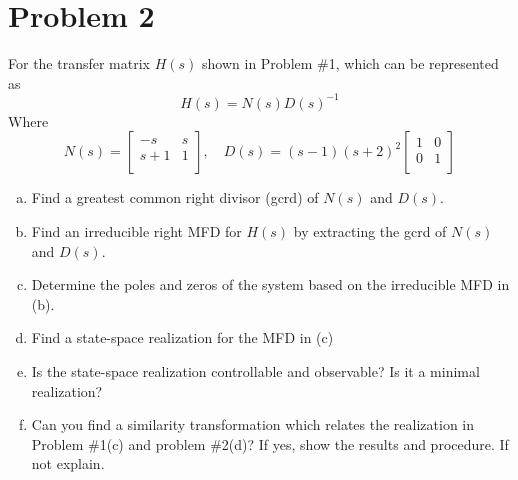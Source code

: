\documentclass{article}
\begin{document}
\section*{Problem 2}
For the transfer matrix $H(s)$ shown in Problem \#1, which can be represented as
$$ H(s) = N(s)D(s)^{-1} $$
Where
$$
N(s) =
\begin{bmatrix}
-s & s \\
s+1 & 1 \\
\end{bmatrix}
,\quad
D(s) =
(s-1)(s+2)^2
\begin{bmatrix}
1 & 0 \\
0 & 1 \\
\end{bmatrix}
$$
\begin{enumerate}[(a)]
\item Find a greatest common right divisor (gcrd) of $N(s)$ and $D(s)$.
\newline

\item Find an irreducible right MFD for $H(s)$ by extracting the gcrd of $N(s)$ and $D(s)$.
\newline

\item Determine the poles and zeros of the system based on the irreducible MFD in (b).
\newline

\item Find a state-space realization for the MFD in (c)
\newline

\item Is the state-space realization controllable and observable? Is it a minimal realization?
\newline

\item Can you find a similarity transformation which relates the realization in Problem \#1(c) and problem \#2(d)?
If yes, show the results and procedure. If not explain.
\newline

\end{enumerate}

\newpage
\end{document}
